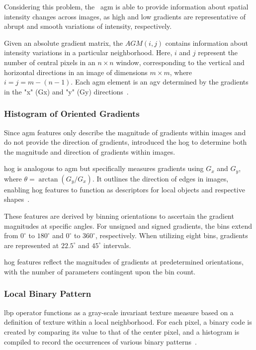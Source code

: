 Considering this problem, the ~\acf{agm} is able to provide information about spatial intensity changes across images, as high and low gradients are representative of abrupt and smooth variations of intensity, respectively.

Given an absolute gradient matrix, the $AGM(i,j)$ contains information about intensity variations in a particular neighborhood. Here, $i$ and $j$ represent the number of central pixels in an $n \times n$ window, corresponding to the vertical and horizontal directions in an image of dimensions $m \times m$, where $i = j = m - (n - 1)$. Each \ac{agm} element is an \ac{agv} determined by the gradients in the "x" (Gx) and "y" (Gy) directions~\cite{abbasian_ardakani_interpretation_2022}.

\subsubsection{Histogram of Oriented Gradients}

Since \ac{agm} features only describe the magnitude of gradients within images and do not provide the direction of gradients, \textcite{dalal_histograms_2005} introduced the \acf{hog} to determine both the magnitude and direction of gradients within images.

\ac{hog} is analogous to \ac{agm} but specifically measures gradients using $G_x$ and $G_y$, where $\theta = \arctan(G_y/G_x)$. It outlines the direction of edges in images, enabling \ac{hog} features to function as descriptors for local objects and respective shapes~\cite{abbasian_ardakani_interpretation_2022}.

These features are derived by binning orientations to ascertain the gradient magnitudes at specific angles. For unsigned and signed gradients, the bins extend from $0^\circ$ to $180^\circ$ and $0^\circ$ to $360^\circ$, respectively. When utilizing eight bins, gradients are represented at $22.5^\circ$ and $45^\circ$ intervals.

\ac{hog} features reflect the magnitudes of gradients at predetermined orientations, with the number of parameters contingent upon the bin count.


\subsubsection{Local Binary Pattern}

\acf{lbp} operator functions as a gray-scale invariant texture measure based on a definition of texture within a local neighborhood. For each pixel, a binary code is created by comparing its value to that of the center pixel, and a histogram is compiled to record the occurrences of various binary patterns~\cite{pietikainen_image_2005, abbasian_ardakani_interpretation_2022}.


